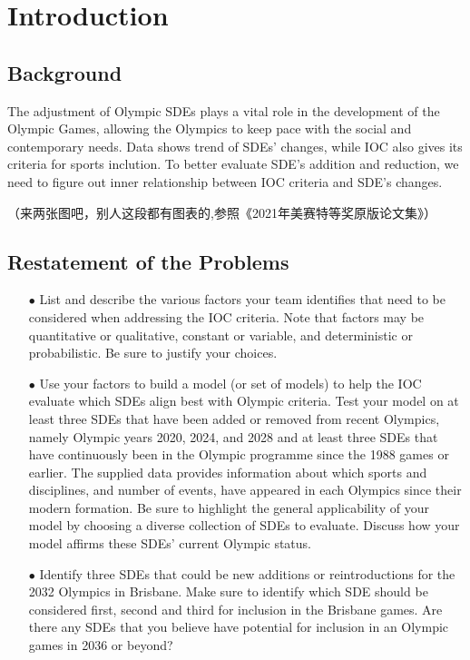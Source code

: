 \documentclass[a4paper]{article}
\begin{document}
\section{Introduction}

\subsection{Background}  
The adjustment of Olympic SDEs plays a vital role in the development of the Olympic Games, allowing the Olympics to keep pace with the social and contemporary needs. Data shows trend of SDEs' changes, while IOC also gives its criteria for sports inclution. To better evaluate SDE's addition and reduction, we need to figure out inner relationship between IOC criteria and SDE's changes.

（来两张图吧，别人这段都有图表的,参照《2021年美赛特等奖原版论文集》）
\subsection{Restatement of the Problems}
\begin{itemize}
\item[$\bullet$]List and describe the various factors your team identifies that need to be
considered when addressing the IOC criteria. Note that factors may be quantitative or qualitative,
constant or variable, and deterministic or probabilistic. Be sure to justify your choices.
\item[$\bullet$]Use your factors to build a model (or set of models) to help the IOC evaluate
which SDEs align best with Olympic criteria. Test your model on at least three SDEs that have been added or removed from recent
Olympics, namely Olympic years 2020, 2024, and 2028 and at least three SDEs that have
continuously been in the Olympic programme since the 1988 games or earlier. The
supplied data provides information about which sports and
disciplines, and number of events, have appeared in each Olympics since their modern
formation. Be sure to highlight the general applicability of your model by choosing a
diverse collection of SDEs to evaluate. Discuss how your model affirms these SDEs’
current Olympic status.
\item[$\bullet$]Identify three SDEs that could be new additions or reintroductions for the 2032 Olympics
in Brisbane. Make sure to identify which SDE should be considered first, second and
third for inclusion in the Brisbane games. Are there any SDEs that you believe have
potential for inclusion in an Olympic games in 2036 or beyond?
\end{itemize}
\end{document}

